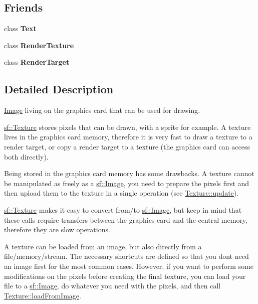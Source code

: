 \subsection*{Friends}
\begin{DoxyCompactItemize}
\item 
\mbox{\label{classsf_1_1_texture_aee0ad1dafe471596e6d25530d9fbaf0c}} 
class {\bfseries Text}
\item 
\mbox{\label{classsf_1_1_texture_a2548fc9744f5e43e0276d5627ca178de}} 
class {\bfseries Render\+Texture}
\item 
\mbox{\label{classsf_1_1_texture_aa5afc6f82b7b587ed5ada4d227ce32aa}} 
class {\bfseries Render\+Target}
\end{DoxyCompactItemize}


\subsection{Detailed Description}
\mbox{\hyperlink{classsf_1_1_image}{Image}} living on the graphics card that can be used for drawing. 

\begin{DoxyVerb}\end{DoxyVerb}


\mbox{\hyperlink{classsf_1_1_texture}{sf\+::\+Texture}} stores pixels that can be drawn, with a sprite for example. A texture lives in the graphics card memory, therefore it is very fast to draw a texture to a render target, or copy a render target to a texture (the graphics card can access both directly).

Being stored in the graphics card memory has some drawbacks. A texture cannot be manipulated as freely as a \mbox{\hyperlink{classsf_1_1_image}{sf\+::\+Image}}, you need to prepare the pixels first and then upload them to the texture in a single operation (see \mbox{\hyperlink{classsf_1_1_texture_ae4eab5c6781316840b0c50ad08370963}{Texture\+::update}}).

\mbox{\hyperlink{classsf_1_1_texture}{sf\+::\+Texture}} makes it easy to convert from/to \mbox{\hyperlink{classsf_1_1_image}{sf\+::\+Image}}, but keep in mind that these calls require transfers between the graphics card and the central memory, therefore they are slow operations.

A texture can be loaded from an image, but also directly from a file/memory/stream. The necessary shortcuts are defined so that you don\textquotesingle{}t need an image first for the most common cases. However, if you want to perform some modifications on the pixels before creating the final texture, you can load your file to a \mbox{\hyperlink{classsf_1_1_image}{sf\+::\+Image}}, do whatever you need with the pixels, and then call \mbox{\hyperlink{classsf_1_1_texture_abec4567ad9856a3596dc74803f26fba2}{Texture\+::load\+From\+Image}}.

